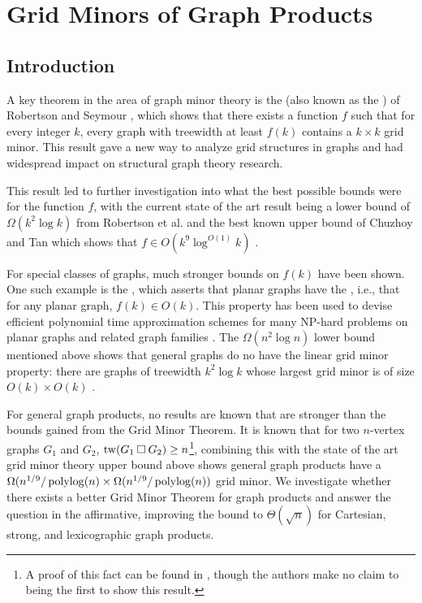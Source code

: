 \documentclass[../main.tex]{subfiles}
\begin{document}
	\section{Grid Minors of Graph Products}
	\subsection{Introduction}
	A key theorem in the area of graph minor theory is the  (also known as the ) of Robertson and Seymour \cite{RS-V}, which shows that there exists a function $f$ such that for every integer $k$, every graph with treewidth at least $f(k)$ contains a $k \times k$ grid minor. This result gave a new way to analyze grid structures in graphs and had widespread impact on structural graph theory research.
	
	This result led to further investigation into what the best possible bounds were for the function $f$, with the current state of the art result being a lower bound of $\Omega(k^2\log k)$ from Robertson et al. \cite{RST-JCTB94} and the best known upper bound of Chuzhoy and Tan which shows that $f \in O(k^9\log^{O(1)}k)$ \cite{CT21}.
	
	For special classes of graphs, much stronger bounds on $f(k)$ have been shown. One such example is the , which asserts that planar graphs have the , i.e., that for any planar graph, $f(k) \in O(k)$.  This property has been used to devise efficient polynomial time approximation schemes for many NP-hard problems on planar graphs and related graph families \cite{DHK-Algo09,DFHT-JACM05,DH-Algo04, Eppstein-Algo00, FFLS18}. The $\Omega(n^2\log n)$ lower bound mentioned above shows that general graphs do no have the linear grid minor property: there are graphs of treewidth $k^2\log k$ whose largest grid minor is of size $O(k)\times O(k)$ \cite{RST-JCTB94}.
	
	For general graph products, no results are known that are stronger than the bounds gained from the Grid Minor Theorem. It is known that for two $n$-vertex graphs $G_1$ and $G_2$, $\operatorname{tw}(G_1 \mathbin{\Box} G_2) \ge n$\footnote{A proof of this fact can be found in \cite{DMWW24}, though the authors make no claim to being the first to show this result.}, combining this with the state of the art grid minor theory upper bound above shows general graph products have a $\Omega(n^{1/9}/\operatorname{polylog}(n) \times \Omega(n^{1/9}/\operatorname{polylog}(n))$ grid minor. We investigate whether there exists a better Grid Minor Theorem for graph products and answer the question in the affirmative, improving the bound to $\Theta(\sqrt{n})$ for Cartesian, strong, and lexicographic graph products.
	
\end{document}
